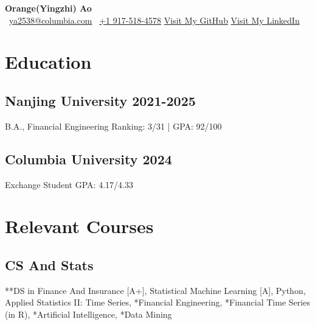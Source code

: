 \documentclass[a4paper]{article}
\newcommand{\org}{\color{org}}
\begin{document}
\begin{center}      
    {\fontsize{25}{25}\selectfont\bfseries Orange(Yingzhi) Ao} \\ \vspace{9pt}
    {\org\faEnvelope[regular]}\ \href{mailto:ya2538@columbia.edu}{ya2538@columbia.com} \hfill
    {\org{}}\ \href{tel:+1 9175184578}{+1 917-518-4578} \hfill
    {\org\faGithub} \href{https://github.com/OrangeAoo}{Visit My GitHub}  \hfill
    {\org\faLinkedin} \href{http://linkedin.com/in/orange-ao}{Visit My LinkedIn}
\end{center}




\section{Education}  %

\subsection{Nanjing University \normalfont \hfill 2021-2025}
B.A., Financial Engineering \hfill Ranking: 3/31 | GPA: 92/100

\subsection{Columbia University  \normalfont \hfill 2024}
Exchange Student \hfill GPA: 4.17/4.33

\section{Relevant Courses}
\subsection{CS And Stats}
**DS in Finance And Insurance [A+], Statistical Machine Learning [A], Python, Applied Statistics II: Time Series, *Financial Engineering, *Financial Time Series (in R), *Artificial Intelligence, *Data Mining
\end{document}
